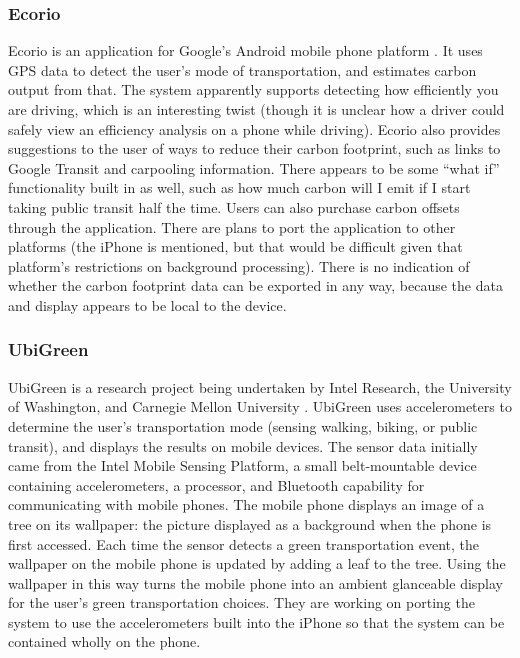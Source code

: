 \subsubsection{Ecorio}
\label{sec:ecorio}

Ecorio is an application for Google's Android mobile phone platform \cite{Ecorio-website}. It uses GPS data to detect the user's mode of transportation, and estimates carbon output from that. The system apparently supports detecting how efficiently you are driving, which is an interesting twist (though it is unclear how a driver could safely view an efficiency analysis on a phone while driving). Ecorio also provides suggestions to the user of ways to reduce their carbon footprint, such as links to Google Transit and carpooling information. There appears to be some ``what if'' functionality built in as well, such as how much carbon will I emit if I start taking public transit half the time. Users can also purchase carbon offsets through the application. There are plans to port the application to other platforms (the iPhone is mentioned, but that would be difficult given that platform's restrictions on background processing). There is no indication of whether the carbon footprint data can be exported in any way, because the data and display appears to be local to the device.

\subsubsection{UbiGreen}
\label{sec:ubigreen}

UbiGreen is a research project being undertaken by Intel Research, the University of Washington, and Carnegie Mellon University \cite{ubigreen-website}. UbiGreen uses accelerometers to determine the user's transportation mode (sensing walking, biking, or public transit), and displays the results on mobile devices. The sensor data initially came from the Intel Mobile Sensing Platform, a small belt-mountable device containing accelerometers, a processor, and Bluetooth capability for communicating with mobile phones. The mobile phone displays an image of a tree on its wallpaper: the picture displayed as a background when the phone is first accessed. Each time the sensor detects a green transportation event, the wallpaper on the mobile phone is updated by adding a leaf to the tree. Using the wallpaper in this way turns the mobile phone into an ambient glanceable display for the user's green transportation choices. They are working on porting the system to use the accelerometers built into the iPhone so that the system can be contained wholly on the phone.

